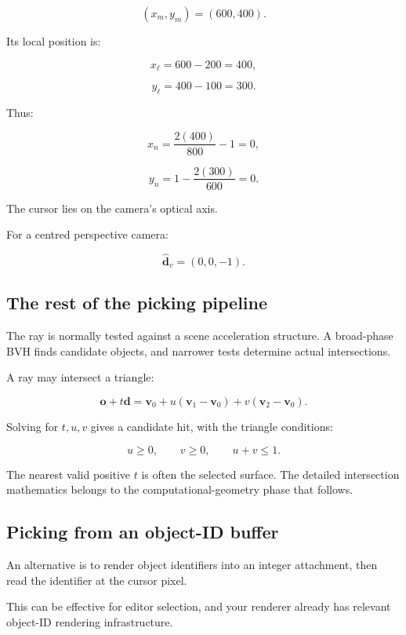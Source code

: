 \[ (x_m,y_m)=(600,400). \]

Its local position is:

\[ x_\ell=600-200=400, \]

\[ y_\ell=400-100=300. \]

Thus:

\[ x_n=\frac{2(400)}{800}-1=0, \]

\[ y_n=1-\frac{2(300)}{600}=0. \]

The cursor lies on the camera's optical axis.

For a centred perspective camera:

\[ \boxed{ \hat{\mathbf d}_v=(0,0,-1). } \]

\subsection{The rest of the picking pipeline}\label{02-foundations-ii-ch035-the-rest-of-the-picking-pipeline}

\hypertarget{02-foundations-ii-ch035-the-rest-of-the-picking-pipeline}{}

The ray is normally tested against a scene acceleration structure. A broad-phase BVH finds candidate objects, and narrower tests determine actual intersections.

A ray may intersect a triangle:

\[ \mathbf o+t\mathbf d = \mathbf v_0+ u(\mathbf v_1-\mathbf v_0)+ v(\mathbf v_2-\mathbf v_0). \]

Solving for \(t,u,v\) gives a candidate hit, with the triangle conditions:

\[ u\ge0,\qquad v\ge0,\qquad u+v\le1. \]

The nearest valid positive \(t\) is often the selected surface. The detailed intersection mathematics belongs to the computational-geometry phase that follows.

\subsection{Picking from an object-ID buffer}\label{02-foundations-ii-ch035-picking-from-an-object-id-buffer}

\hypertarget{02-foundations-ii-ch035-picking-from-an-object-id-buffer}{}

An alternative is to render object identifiers into an integer attachment, then read the identifier at the cursor pixel.

This can be effective for editor selection, and your renderer already has relevant object-ID rendering infrastructure.

